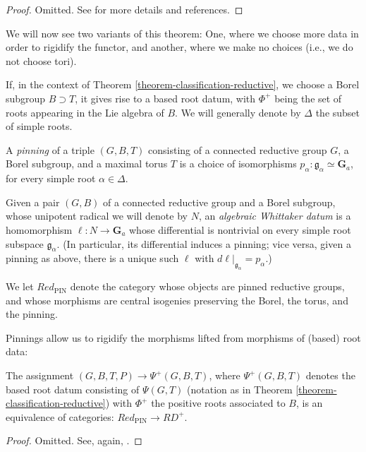 \begin{proof}
 Omitted. See \cite{Springer-Corvallis} for more details and references.
\end{proof}

We will now see two variants of this theorem: One, where we choose more data in order to rigidify the functor, and another, where we make no choices (i.e., we do not choose tori).


If, in the context of Theorem \ref{theorem-classification-reductive}, we choose a Borel subgroup $B\supset T$, it gives rise to a based root datum, with $\Phi^+$ being the set of roots appearing in the Lie algebra of $B$. We will generally denote by $\Delta$ the subset of simple roots.

\begin{definition}
 \label{definition-pinning}
A {\it pinning} of a triple $(G, B, T)$ consisting of a connected reductive group $G$, a Borel subgroup,  and a maximal torus $T$ is a choice of isomorphisms $p_\alpha:\mathfrak g_\alpha \simeq \mathbf G_a$, for every simple root $\alpha\in \Delta$.

Given a pair $(G,B)$ of a connected reductive group and a Borel subgroup, whose unipotent radical we will denote by $N$, an {\it algebraic Whittaker datum} is a homomorphism $\ell:N\to \mathbf G_a$ whose differential is nontrivial on every simple root subspace $\mathfrak g_\alpha$. (In particular, its differential induces a pinning; vice versa, given a pinning as above, there is a unique such $\ell$ with $d\ell|_{\mathfrak g_\alpha} = p_\alpha$.)

We let $Red_{\text{PIN}}$ denote the category whose objects are pinned reductive groups, and whose morphisms are central isogenies preserving the Borel, the torus, and the pinning.
\end{definition}

Pinnings allow us to rigidify the morphisms lifted from morphisms of (based) root data:

\begin{theorem}
\label{theorem-classification-with-pinning}
The assignment $(G, B, T, P) \to \Psi^+(G,B,T)$, where $\Psi^+(G,B,T)$ denotes the based root datum consisting of $\Psi(G,T)$ (notation as in Theorem \ref{theorem-classification-reductive}) with $\Phi^+$ the positive roots associated to $B$, is an equivalence of categories: $Red_{\text{PIN}}\to RD^+$.
\end{theorem}

\begin{proof}
 Omitted. See, again, \cite{Springer-Corvallis}. 
\end{proof}

